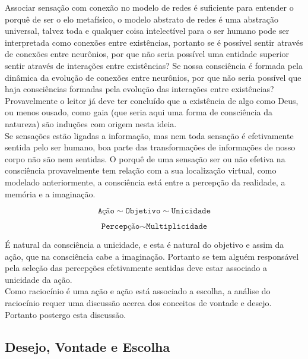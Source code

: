 \documentclass[10pt,a4paper]{report}
\begin{document}
Associar sensação com conexão no modelo de redes é suficiente para entender o porquê de ser o elo metafísico, o modelo abstrato de redes é uma abstração universal, talvez toda e qualquer coisa intelectível para o ser humano pode ser interpretada como conexões entre existências, portanto se é possível sentir através de conexões entre neurônios, por que não seria possível uma entidade superior sentir através de interações entre existências? Se nossa consciência é formada pela dinâmica da evolução de conexões entre neurônios, por que não seria possível que haja consciências formadas pela evolução das interações entre existências? Provavelmente o leitor já deve ter concluído que a existência de algo como Deus, ou menos ousado, como gaia (que seria aqui uma forma de consciência da natureza) são induções com origem nesta ideia.\\

Se sensações estão ligadas a informação, mas nem toda sensação é efetivamente sentida pelo ser humano, boa parte das transformações de informações de nosso corpo não são nem sentidas. O porquê de uma sensação ser ou não efetiva na consciência provavelmente tem relação com a sua localização virtual, como modelado anteriormente, a consciência está entre a percepção da realidade, a memória e a imaginação.

$$ \texttt{Ação} \sim \texttt{Objetivo} \sim \texttt{Unicidade} $$ 

$$ \texttt{Percepção} \sim \texttt{Multiplicidade} $$

É natural da consciência a unicidade, e esta é natural do objetivo e assim da ação, que na consciência cabe a imaginação. Portanto se tem alguém responsável pela seleção das percepções efetivamente sentidas deve estar associado a unicidade da ação.\\


Como raciocínio é uma ação e ação está associado a escolha, a análise do raciocínio requer uma discussão acerca dos conceitos de vontade e desejo. Portanto postergo esta discussão.





\subsection{Desejo, Vontade e Escolha}
\end{document}
